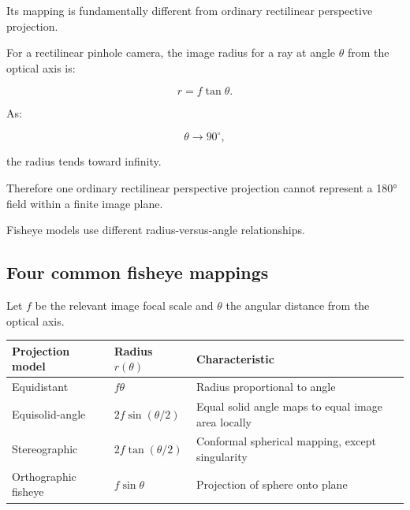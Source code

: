 Its mapping is fundamentally different from ordinary rectilinear perspective projection.

For a rectilinear pinhole camera, the image radius for a ray at angle \(\theta\) from the optical axis is:

\[ \boxed{ r=f\tan\theta. } \]

As:

\[ \theta\to90^\circ, \]

the radius tends toward infinity.

Therefore one ordinary rectilinear perspective projection cannot represent a 180° field within a finite image plane.

Fisheye models use different radius-versus-angle relationships.

\subsection{Four common fisheye mappings}\label{02-foundations-ii-ch035-four-common-fisheye-mappings}

Let \(f\) be the relevant image focal scale and \(\theta\) the angular distance from the optical axis.

{\def\LTcaptype{none} %
\begin{longtable}[]{@{}
  >{\raggedright\arraybackslash}p{}
  >{\raggedright\arraybackslash}p{}
  >{\raggedright\arraybackslash}p{}@{}}
\toprule\noalign{}
\begin{minipage}[b]{\linewidth}\raggedright
Projection model
\end{minipage} & \begin{minipage}[b]{\linewidth}\raggedright
Radius \(r(\theta)\)
\end{minipage} & \begin{minipage}[b]{\linewidth}\raggedright
Characteristic
\end{minipage} \\
\midrule\noalign{}
\endhead
\bottomrule\noalign{}
\endlastfoot
Equidistant & \(f\theta\) & Radius proportional to angle \\
Equisolid-angle & \(2f\sin(\theta/2)\) & Equal solid angle maps to equal image area locally \\
Stereographic & \(2f\tan(\theta/2)\) & Conformal spherical mapping, except singularity \\
Orthographic fisheye & \(f\sin\theta\) & Projection of sphere onto plane \\
\end{longtable}
}

